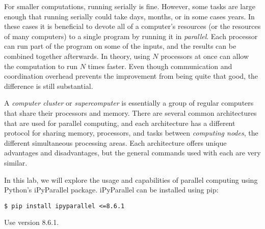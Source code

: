 \begin{comment} %
This can be visualized as a program that runs all of its computations on a single processor or core.
Figure \ref{fig:htop} visualizes what this would look like by using the Linux command \li{htop}.
This command shows which programs are running, how many resources they are using up, and how much each processor core is running.

\begin{figure}[!tbp]
  \begin{subfigure}[b]{0.49\textwidth}
    \texttt{[image: figures/activenew.jpg]}
    \caption{Serial}
  \end{subfigure}
  \hfill
  \begin{subfigure}[b]{0.49\textwidth}
    \texttt{[image: figures/cluster\_activenew.jpg]}
    \caption{Parallel}
  \end{subfigure}
  \caption{In the serial implementation, one core is running the program. In the parallel, it is split across all cores.}
  \label{fig:htop}
\end{figure}
\end{comment}

For smaller computations, running serially is fine.
However, some tasks are large enough that running serially could take days, months, or in some cases years.
In these cases it is beneficial to devote all of a computer's resources (or the resources of many computers) to a single program by running it in \emph{parallel}.
Each processor can run part of the program on some of the inputs, and the results can be combined together afterwards.
In theory, using $N$ processors at once can allow the computation to run $N$ times faster.
Even though communication and coordination overhead prevents the improvement from being quite that good, the difference is still substantial.

A \emph{computer cluster} or \emph{supercomputer} is essentially a group of regular computers that share their processors and memory.
There are several common architectures that are used for parallel computing, and each architecture has a different protocol for sharing memory, processors, and tasks between \emph{computing nodes}, the different simultaneous processing areas.
Each architecture offers unique advantages and disadvantages, but the general commands used with each are very similar.

In this lab, we will explore the usage and capabilities of parallel computing using Python's iPyParallel package.
iPyParallel can be installed using pip:
\begin{lstlisting}
$ pip install ipyparallel <=8.6.1
\end{lstlisting}
Use version 8.6.1.

